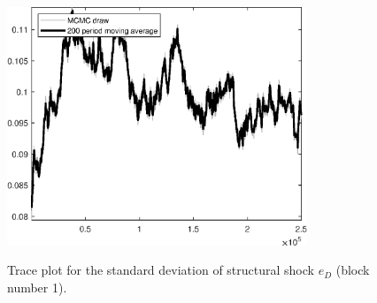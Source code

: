 \begin{figure}[H]
\centering
  \includegraphics[width=0.8\textwidth]{BRS_extended_fd/graphs/TracePlot_SE_e_D_blck_1}\\
    \caption{Trace plot for the standard deviation of structural shock ${e_D}$ (block number 1).}
\end{figure}
